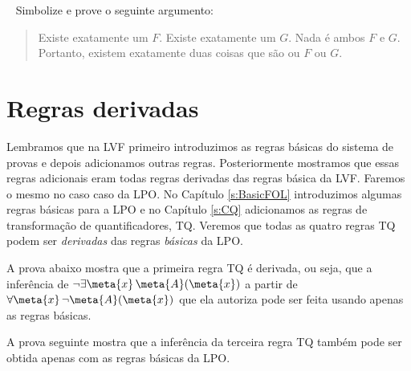 \
\problempart
Simbolize e prove o seguinte argumento:
	\begin{quote}
		Existe exatamente um $F$. Existe exatamente um $G$. Nada é ambos $F$ e $G$. Portanto, existem exatamente duas coisas que  são ou $F$ ou $G$.
	\end{quote}
 




\chapter{Regras derivadas}\label{s:DerivedFOL}
Lembramos que na LVF primeiro introduzimos as regras básicas do sistema de provas e depois adicionamos outras regras.  Posteriormente mostramos que essas regras adicionais eram todas regras derivadas das regras básica da LVF. Faremos o mesmo no caso caso da LPO.  No  Capítulo  \ref{s:BasicFOL} introduzimos algumas regras básicas para a LPO e no Capítulo  \ref{s:CQ} adicionamos  as  regras de transformação de quantificadores, TQ.  Veremos que todas as quatro regras TQ podem ser \emph{derivadas} das regras \emph{básicas} da LPO.  

A prova abaixo mostra que a primeira regra TQ é derivada, ou seja, que a inferência de $\enot\exists \meta{x}\, \atom{\meta{A}}{\meta{x}}$ a partir de $\forall \meta{x}\, \enot \atom{\meta{A}}{\meta{x}}$ que ela autoriza pode ser feita usando apenas as regras básicas.
\begin{fitchproof}
	\open
		\open
		\close
	\close
\end{fitchproof}
A prova seguinte mostra que a inferência da terceira regra TQ também pode ser obtida apenas com as regras básicas da LPO.  
   
